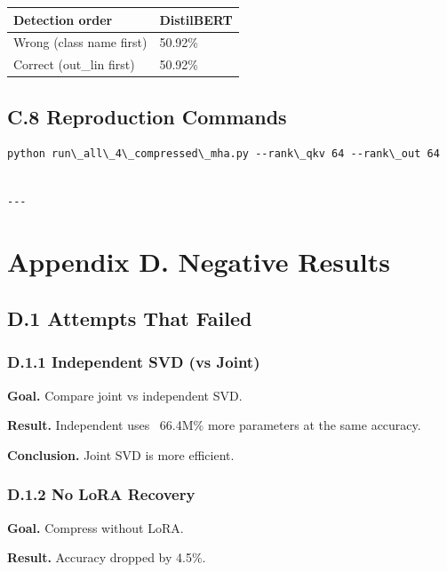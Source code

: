 \begin{table}[H]
\centering
\small
\begin{tabular}{ll}
\toprule
\textbf{Detection order} & \textbf{DistilBERT} \\
\midrule
Wrong (class name first) & 50.92\% \\
Correct (out\_lin first) & 50.92\% \\
\bottomrule
\end{tabular}
\end{table}

\subsection{C.8 Reproduction Commands}

\begin{lstlisting}
python run\_all\_4\_compressed\_mha.py --rank\_qkv 64 --rank\_out 64
\end{lstlisting}
\begin{lstlisting}

---
\end{lstlisting}

\section{Appendix D. Negative Results}

\subsection{D.1 Attempts That Failed}

\subsubsection{D.1.1 Independent SVD (vs Joint)}

\textbf{Goal.} Compare joint vs independent SVD.

\textbf{Result.} Independent uses ~66.4M\% more parameters at the 
same accuracy.

\textbf{Conclusion.} Joint SVD is more efficient.

\subsubsection{D.1.2 No LoRA Recovery}

\textbf{Goal.} Compress without LoRA.

\textbf{Result.} Accuracy dropped by 4.5\%.

